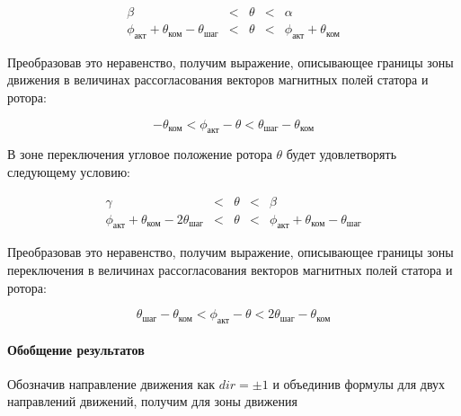 \begin{equation}
    \label{movement_zone_negat_move_for_curr_pos}
    \begin{array}{ccccc}
        \beta & < & \theta & < & \alpha                                         \\
        \phi_\textit{акт} + \theta_\textit{ком} - \theta_\textit{шаг} & < & \theta
        & < &\phi_\textit{акт} + \theta_\textit{ком}
    \end{array}
\end{equation}

Преобразовав это неравенство, получим выражение, описывающее границы зоны движения
в величинах рассогласования векторов магнитных полей статора и ротора:

\begin{equation}
    \label{movement_zone_negat_move_for_delta}
    -\theta_\textit{ком} < \phi_\textit{акт} - \theta
    < \theta_\textit{шаг} - \theta_\textit{ком}
\end{equation}

В зоне переключения угловое положение ротора $\theta$ будет удовлетворять следующему условию:

\begin{equation}
    \label{switch_zone_negat_move_for_curr_pos}
    \begin{array}{ccccc}
        \gamma & < & \theta & < & \beta                                         \\
        \phi_\textit{акт} + \theta_\textit{ком} - 2\theta_\textit{шаг} & < & \theta
        & < &\phi_\textit{акт} + \theta_\textit{ком} - \theta_\textit{шаг}
    \end{array}
\end{equation}

Преобразовав это неравенство, получим выражение, описывающее границы зоны переключения
в величинах рассогласования векторов магнитных полей статора и ротора:

\begin{equation}
    \label{switch_zone_negat_move_for_delta}
    \theta_\textit{шаг} - \theta_\textit{ком} < \phi_\textit{акт} - \theta
    < 2\theta_\textit{шаг} - \theta_\textit{ком}
\end{equation}


\paragraph{Обобщение результатов}

Обозначив направление движения как $\textit{dir} = \pm 1$ и объединив формулы
для двух направлений движений, получим для зоны движения

